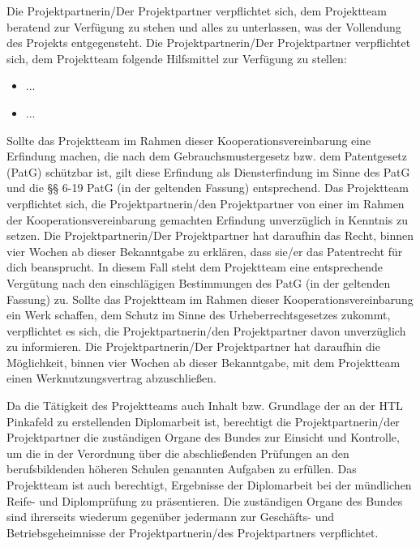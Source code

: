 Die Projektpartnerin/Der Projektpartner verpflichtet sich, dem Projektteam beratend zur Verfügung zu stehen und alles zu unterlassen, was der Vollendung des Projekts entgegensteht. Die Projektpartnerin/Der Projektpartner verpflichtet sich, dem Projektteam folgende Hilfsmittel zur Verfügung zu stellen: 
\begin{itemize}
    \item ...
    \item ...
\end{itemize}

Sollte das Projektteam im Rahmen dieser Kooperationsvereinbarung eine Erfindung machen, die nach dem Gebrauchsmustergesetz bzw. dem Patentgesetz (PatG) schützbar ist, gilt diese Erfindung als Diensterfindung im Sinne des PatG und die §§ 6-19 PatG (in der geltenden Fassung) entsprechend. Das Projektteam verpflichtet sich, die Projektpartnerin/den Projektpartner von einer im Rahmen der Kooperationsvereinbarung gemachten Erfindung unverzüglich in Kenntnis zu setzen. Die Projektpartnerin/Der Projektpartner hat daraufhin das Recht, binnen vier Wochen ab dieser Bekanntgabe zu erklären, dass sie/er das Patentrecht für dich beansprucht. In diesem Fall steht dem Projektteam eine entsprechende Vergütung nach den einschlägigen Bestimmungen des PatG (in der geltenden Fassung) zu. Sollte das Projektteam im Rahmen dieser Kooperationsvereinbarung ein Werk schaffen, dem Schutz im Sinne des Urheberrechtsgesetzes zukommt, verpflichtet es sich, die Projektpartnerin/den Projektpartner davon unverzüglich zu informieren. Die Projektpartnerin/Der Projektpartner hat daraufhin die Möglichkeit, binnen vier Wochen ab dieser Bekanntgabe, mit dem Projektteam einen Werknutzungsvertrag abzuschließen. 

Da die Tätigkeit des Projektteams auch Inhalt bzw. Grundlage der an der HTL Pinkafeld zu erstellenden Diplomarbeit ist, berechtigt die Projektpartnerin/der Projektpartner die zuständigen Organe des Bundes zur Einsicht und Kontrolle, um die in der Verordnung über die abschließenden Prüfungen an den berufsbildenden höheren Schulen genannten Aufgaben zu erfüllen. Das Projektteam ist auch berechtigt, Ergebnisse der Diplomarbeit bei der mündlichen Reife- und Diplomprüfung zu präsentieren. Die zuständigen Organe des Bundes sind ihrerseits wiederum gegenüber jedermann zur Geschäfts- und Betriebsgeheimnisse der Projektpartnerin/des Projektpartners verpflichtet. 


